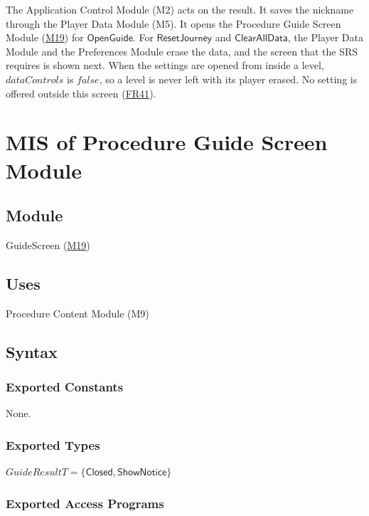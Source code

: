 \documentclass[10pt, titlepage]{article}
\newcommand{\srsurl}{https://team-hindsight.github.io/ophthamology-game/SRS/SRS.pdf}
\newcommand{\srsitemref}[2]{\href{\srsurl\#nameddest=#1}{#2}}
\newcommand{\misref}[2]{\hyperref[mis:#1]{M#2}}
\newcommand{\T}[1]{\mathit{#1}}          %
\newcommand{\V}[1]{\mathsf{#1}}          %
\newcommand{\false}{\mathit{false}}
\begin{document}
The Application Control Module (M2) acts on the result. It saves the nickname
through the Player Data Module (M5). It opens the Procedure Guide Screen Module
(\misref{Guide}{19}) for $\V{OpenGuide}$. For $\V{ResetJourney}$ and
$\V{ClearAllData}$, the Player Data Module and the Preferences Module erase the
data, and the screen that the SRS requires is shown next. When the settings are
opened from inside a level, $\T{dataControls}$ is $\false$, so a level is never
left with its player erased. No setting is offered outside this screen
(\srsitemref{FR_ParentGate}{FR41}).

\newpage
\section{MIS of Procedure Guide Screen Module} \label{mis:Guide}

\subsection{Module}

GuideScreen (\misref{Guide}{19})

\subsection{Uses}

Procedure Content Module (M9)

\subsection{Syntax}

\subsubsection{Exported Constants}

None.

\subsubsection{Exported Types}

$\T{GuideResultT} = \{\V{Closed}, \V{ShowNotice}\}$

\subsubsection{Exported Access Programs}
\end{document}
